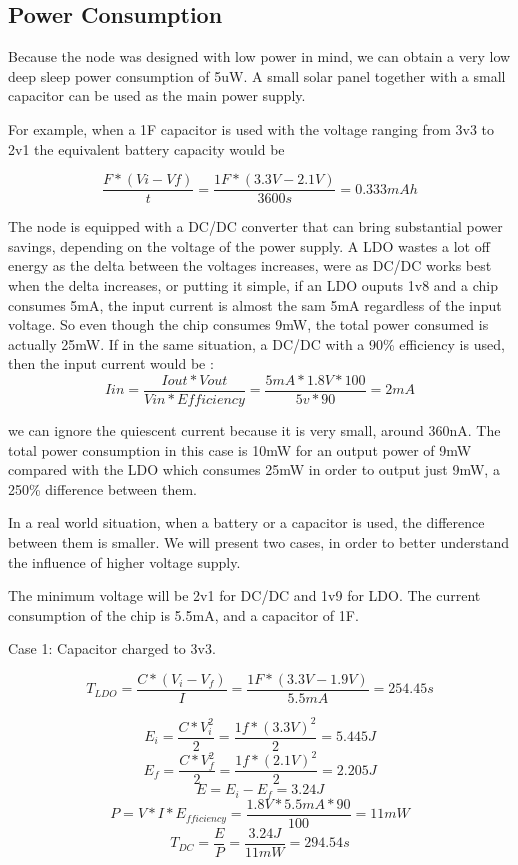 \label{chap:results}


\subsection{Power Consumption}

Because the node was designed with low power in mind, we can obtain a very low deep sleep power
consumption of 5uW. A small solar panel together with a
small capacitor can be used as the main power supply.

For example, when a 1F capacitor is used with the voltage ranging from 3v3 to 2v1 the equivalent battery capacity would be

$$ \frac{F * (Vi - Vf)}{t} = \frac{1F * (3.3V - 2.1V)}{3600s} = 0.333mAh$$

The node is equipped with a DC/DC converter that can bring substantial power savings, depending on
the voltage of the power supply. A LDO wastes a lot off energy as the delta between the
voltages increases, were as DC/DC works best when the delta increases, or putting it simple, if an
LDO ouputs 1v8 and a chip consumes 5mA, the input current is almost the sam 5mA regardless of the
input voltage. So even though the chip consumes 9mW, the total power consumed is actually 25mW. If
in the same situation, a DC/DC with a 90\% efficiency is used, then the input current would be :
$$Iin = \frac{Iout * Vout}{Vin*Efficiency} = \frac{5mA * 1.8V*100}{5v*90}= 2mA$$


we can ignore the quiescent current because it is very small, around 360nA. The total power
consumption in this case is 10mW for an output power of 9mW compared with the LDO which consumes
25mW in order to output just 9mW, a 250\% difference between them.

In a real world situation, when a battery or a capacitor is used, the difference between them is
smaller. We will present two cases, in order to better understand the influence of higher
voltage supply.

The minimum voltage will be 2v1 for DC/DC and 1v9 for LDO. The current consumption of the chip is
5.5mA, and a capacitor of 1F.

Case 1: Capacitor charged to 3v3.

$$T_{LDO} = \frac{C * (V_i - V_f)}{I}=\frac{1F * (3.3V - 1.9V)}{5.5mA} = 254.45s $$

$$E_i = \frac{C*V_i^2}{2} = \frac{1f*(3.3V)^2}{2} =5.445J$$
$$E_f = \frac{C*V_f^2}{2} = \frac{1f*(2.1V)^2}{2} =2.205J$$
$$E = E_i - E_f = 3.24J$$
$$P = V*I*E_{fficiency }= \frac{1.8V * 5.5mA * 90}{100} = 11mW$$
$$T_{DC} = \frac{E}{P} = \frac{3.24J}{11mW} =294.54s $$

